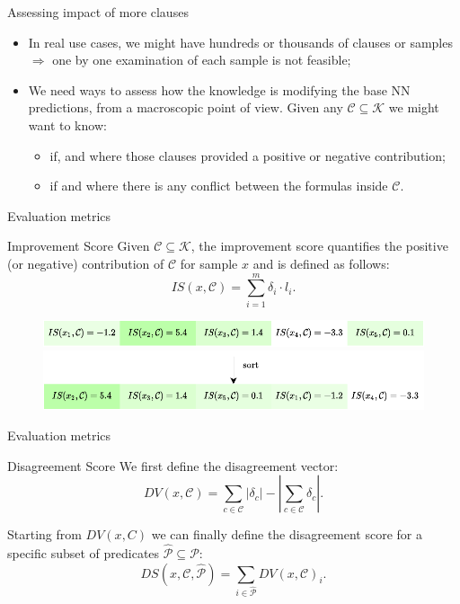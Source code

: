 \documentclass{beamer}
\begin{document}
\begin{frame}{Assessing impact of more clauses}
	\begin{itemize}
		\item In real use cases, we might have hundreds or thousands of clauses or samples $\Rightarrow$ one by one examination of each sample is not feasible; \pause
		\item We need ways to assess how the knowledge is modifying the base NN predictions, from a macroscopic point of view. Given any $\mathcal{C} \subseteq \mathcal{K}$ we might want to know: \pause
		\begin{itemize}
			\item if, and where those clauses provided a positive or negative contribution;\pause
			\item if and where there is any conflict between the formulas inside $\mathcal{C}$.
		\end{itemize}
	\end{itemize}
\end{frame}

\begin{frame}{Evaluation metrics}
\begin{block}{Improvement Score}
	Given $\mathcal{C} \subseteq \mathcal{K}$, the improvement score quantifies the positive (or negative) contribution of $\mathcal{C}$ for sample $x$ and is defined as follows:
	$$I S(x, \mathcal{C})=\sum_{i=1}^{m} \delta_{i} \cdot l_{i}.$$
\end{block}

\pause
\begin{figure}
	\includegraphics[width=0.95\linewidth]{images/ordering_metrics0.pdf}\pause
	\vspace{10pt} 
	\includegraphics[width=0.95\linewidth]{images/ordering_metrics1.pdf}
\end{figure}
	
\end{frame}

\begin{frame}{Evaluation metrics}
	\begin{block}{Disagreement Score}
		We first define the disagreement vector:
		$$D V(x, \mathcal{C})=\sum_{c \in \mathcal{C}}\left|\delta_{c}\right|-\left|\sum_{c \in \mathcal{C}} \delta_{c}\right|.$$
		
		Starting from $DV(x,C)$ we can finally define the disagreement score for a specific subset of predicates $\hat{\mathcal{P}} \subseteq \mathcal{P}$:
		$$D S(x, \mathcal{C}, \hat{\mathcal{P}})=\sum_{i\in \hat{\mathcal{P}}} D V(x, \mathcal{C})_{i}.$$
	\end{block}


\end{frame}
\end{document}

